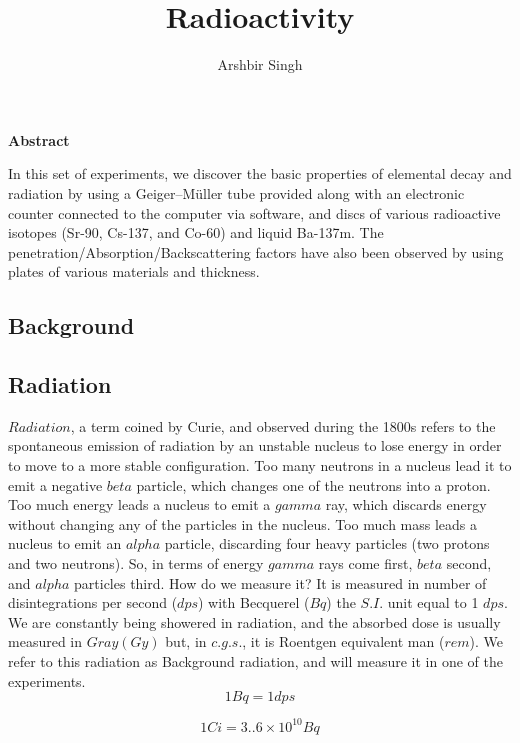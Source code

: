 \documentclass[twocolumn]{article}
\title{\textbf{Radioactivity}}
\author{Arshbir Singh}
\begin{document}
\maketitle
\begin{center}
\Large
\textbf{Abstract}

\end{center}
In this set of experiments, we discover the basic properties of elemental decay and radiation by using a Geiger–Müller tube provided along with an electronic counter connected to the computer via software, and discs of various radioactive isotopes (Sr-90, Cs-137, and Co-60) and liquid Ba-137m. The penetration/Absorption/Backscattering factors have also been observed by using plates of various materials and thickness. 

\begin{center}\section*{Background}\end{center}
\subsection*{Radiation}
$Radiation$, a term coined by Curie, and observed during the 1800s refers to the spontaneous emission of radiation by an unstable nucleus to lose energy in order to move to a more stable configuration. Too many neutrons in a nucleus lead it to emit a negative $beta$ particle, which changes one of the neutrons into a proton. Too much energy leads a nucleus to emit a $gamma$ ray, which discards energy without changing any of the particles in the nucleus. Too much mass leads a nucleus to emit an $alpha$ particle, discarding four heavy particles (two protons and two neutrons). So, in terms of energy $gamma$ rays come first, $beta$ second, and $alpha$ particles third. How do we measure it? It is measured in number of disintegrations per second ($dps$) with Becquerel ($Bq$) the $S.I.$ unit equal to 1 $dps$. We are constantly being showered in radiation, and the absorbed dose is usually measured in $Gray(Gy)$ but, in $c.g.s.$, it is Roentgen equivalent man ($rem$). We refer to this radiation as Background radiation, and will measure it in one of the experiments.\\

\begin{equation*}
1Bq=1dps
\end{equation*}

\begin{equation*}
1Ci=3..6\times10^{10} Bq
\end{equation*}
\end{document}
